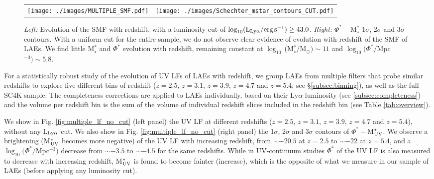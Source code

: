 \documentclass[a4paper,fleqn,usenatbib]{mnras}
\begin{document}
%
%
\begin{figure*}
\begin{tabular}{ll}
  \centering
  \texttt{[image: ./images/MULTIPLE\_SMF.pdf]}
  &
  \texttt{[image: ./images/Schechter\_mstar\_contours\_CUT.pdf]}  
\end{tabular}
  \caption{{\it Left:} Evolution of the SMF with redshift, with a luminosity cut of $\log_{10} (\rm L_{Ly\alpha}/erg\,s^{-1}) \geq 43.0$. {\it Right:} $\Phi^*-$M$_\star^*$ 1$\sigma$, 2$\sigma$ and 3$\sigma$ contours. With a uniform cut for the entire sample, we do not observe clear evidence of evolution with redshift of the SMF of LAEs. We find little M$_\star^*$ and $\Phi^*$ evolution with redshift, remaining constant at $\log_{10}\,$(M$_\star^*$/M$_{\odot})\sim11$ and $\log_{10}(\Phi^*/$Mpc$^{-3})\sim5.8$.}
  \label{fig:multiple_smf}
\end{figure*}

For a statistically robust study of the evolution of UV LFs of LAEs with redshift, we group LAEs from multiple filters that probe similar redshifts to explore five different bins of redshift ($z=2.5$, $z=3.1$, $z=3.9$, $z=4.7$ and $z=5.4$; see \S\ref{subsec:binning}), as well as the full SC4K sample. The completeness corrections are applied to LAEs individually, based on their Ly$\alpha$ luminosity (see \ref{subsec:completeness}) and the volume per redshift bin is the sum of the volume of individual redshift slices included in the redshift bin (see Table \ref{tab:overview}).

We show in Fig. \ref{fig:multiple_lf_no_cut} (left panel) the UV LF at different redshifts ($z=2.5$, $z=3.1$, $z=3.9$, $z=4.7$ and $z=5.4$), without any L$_{\rm Ly\alpha}$ cut. We also show in Fig. \ref{fig:multiple_lf_no_cut} (right panel) the 1$\sigma$, 2$\sigma$ and 3$\sigma$ contours of $\Phi^*-$M$_{\rm UV}^*$. We observe a brightening (M$_{\rm UV}^*$ becomes more negative) of the UV LF with increasing redshift, from $\sim-20.5$ at $z=2.5$ to $\sim-22$ at $z=5.4$, and a $\log_{10}(\Phi^*/$Mpc$^{-3})$ decrease from $\sim-3.5$ to $\sim-4.5$ for the same redshifts. While in UV-continuum studies \citep[e.g.][]{Bouwens2015,Finkelstein2015} $\Phi^*$ of the UV LF is also measured to decrease with increasing redshift, M$_{\rm UV}^*$ is found to become fainter (increase), which is the opposite of what we measure in our sample of LAEs (before applying any luminosity cut). 
\end{document}

